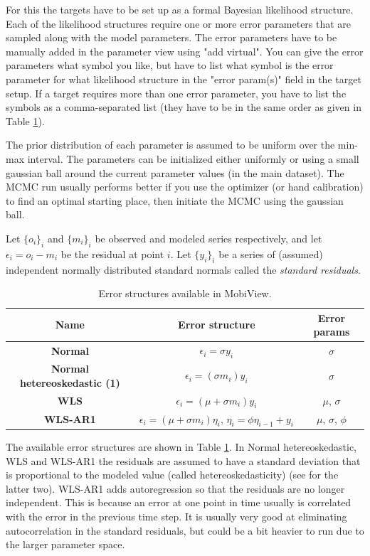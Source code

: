 \documentclass[11pt]{article}
\theoremstyle{definition}
\begin{document}
For this the targets have to be set up as a formal Bayesian likelihood structure. Each of the likelihood structures require one or more error parameters that are sampled along with the model parameters. The error parameters have to be manually added in the parameter view using "add virtual". You can give the error parameters what symbol you like, but have to list what symbol is the error parameter for what likelihood structure in the "error param(s)" field in the target setup. If a target requires more than one error parameter, you have to list the symbols as a comma-separated list (they have to be in the same order as given in Table \ref{tab:errstruct}).

The prior distribution of each parameter is assumed to be uniform over the min-max interval. The parameters can be initialized either uniformly or using a small gaussian ball around the current parameter values (in the main dataset). The MCMC run usually performs better if you use the optimizer (or hand calibration) to find an optimal starting place, then initiate the MCMC using the gaussian ball.

Let $\{o_i\}_i$ and $\{m_i\}_i$ be observed and modeled series respectively, and let $\epsilon_i=o_i-m_i$ be the residual at point $i$. Let $\{y_i\}_i$ be a series of (assumed) independent normally distributed standard normals called the \emph{standard residuals}.
\begin{table}[h!]
\begin{center}
\begin{tabular}{c  c  c}
\hline
{\bf Name } & {\bf Error structure} & {\bf Error params} \\
\hline
{\bf Normal} & $\epsilon_i = \sigma y_i$ & $\sigma$ \\
{\bf Normal hetereoskedastic (1)} & $\epsilon_i = (\sigma m_i) y_i$ & $\sigma$ \\
{\bf WLS} \cite{evin-et-al14} & $\epsilon_i = (\mu + \sigma m_i) y_i$ & $\mu$, $\sigma$ \\
{\bf WLS-AR1} \cite{evin-et-al14} & $\epsilon_i = (\mu + \sigma m_i)\eta_i,\, \eta_i = \phi\eta_{i-1}+y_i$ & $\mu$, $\sigma$, $\phi$ \\
\hline
\end{tabular}
\caption{Error structures available in MobiView.}
\label{tab:errstruct}
\end{center}
\end{table}

The available error structures are shown in Table \ref{tab:errstruct}. In Normal hetereoskedastic, WLS and WLS-AR1 the residuals are assumed to have a standard deviation that is proportional to the modeled value (called hetereoskedasticity) (see \cite{evin-et-al14} for the latter two). WLS-AR1 adds autoregression so that the residuals are no longer independent. This is because an error at one point in time usually is correlated with the error in the previous time step. It is usually very good at eliminating autocorrelation in the standard residuals, but could be a bit heavier to run due to the larger parameter space.
\end{document}
